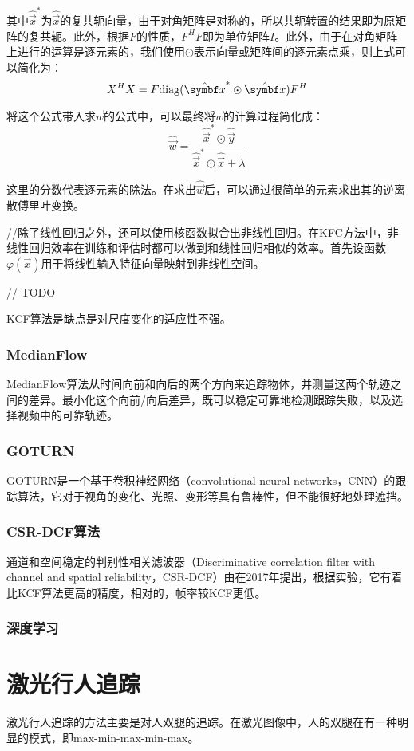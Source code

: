   其中$\hat{\vec{x}}^\ast$为$\hat{\vec{x}}$的复共轭向量，由于对角矩阵是对称的，所以共轭转置的结果即为原矩阵的复共轭。此外，根据$F$的性质，$F^H F $即为单位矩阵$I$。此外，由于在对角矩阵上进行的运算是逐元素的，我们使用$\odot$表示向量或矩阵间的逐元素点乘，则上式可以简化为：
$$X^HX = F {\rm diag}(\hat{\vec{x}}^\ast \odot \hat{\vec{x}}) F^H$$

  将这个公式带入求$\vec{w}$的公式中，可以最终将$\vec{w}$的计算过程简化成：
$$\hat{\vec{w}}=\frac{\hat{\vec{x}}^\ast \odot \hat{\vec{y}}}{\hat{\vec{x}}^\ast \odot \hat{\vec{x}}+\lambda}$$

  这里的分数代表逐元素的除法。在求出$\hat{\vec{w}}$后，可以通过很简单的元素求出其的逆离散傅里叶变换。

  //除了线性回归之外，还可以使用核函数拟合出非线性回归。在KFC方法中，非线性回归效率在训练和评估时都可以做到和线性回归相似的效率。首先设函数$\varphi(\vec{x})$用于将线性输入特征向量映射到非线性空间。

// TODO

  KCF算法是缺点是对尺度变化的适应性不强。

\subsubsection{MedianFlow}
  MedianFlow算法从时间向前和向后的两个方向来追踪物体，并测量这两个轨迹之间的差异。最小化这个向前/向后差异，既可以稳定可靠地检测跟踪失败，以及选择视频中的可靠轨迹。

\subsubsection{GOTURN}

  GOTURN是一个基于卷积神经网络（convolutional neural networks，CNN）的跟踪算法，它对于视角的变化、光照、变形等具有鲁棒性，但不能很好地处理遮挡。

\subsubsection{CSR-DCF算法}
  通道和空间稳定的判别性相关滤波器（Discriminative correlation filter with channel and spatial reliability，CSR-DCF）由\citet{lukezic2017discriminative}在2017年提出，根据实验，它有着比KCF算法更高的精度，相对的，帧率较KCF更低。

\subsubsection{深度学习}

\section{激光行人追踪}
激光行人追踪的方法主要是对人双腿的追踪。在激光图像中，人的双腿在有一种明显的模式，即max-min-max-min-max。
